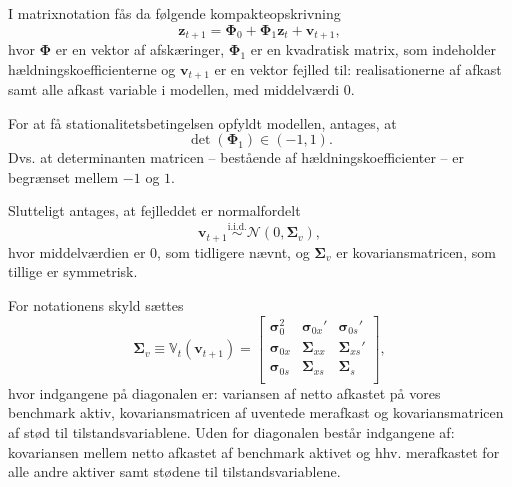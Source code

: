 \documentclass[
  a4paper,
  oneside]{memoir}
\begin{document}
\vspace{5mm}

I matrixnotation fås da følgende kompakteopskrivning
\begin{equation}\label{eq:1}
        \bm{z}_{t+1}=\bm{\Phi}_0+\bm{\Phi}_1\bm{z}_t+\bm{v}_{t+1},
    \end{equation}
hvor \(\bm{\Phi}\) er en vektor af afskæringer, \(\bm{\Phi}_1\) er en kvadratisk matrix, som indeholder hældningskoefficienterne og \(\bm{v}_{t+1}\) er en vektor fejlled til: realisationerne af afkast samt alle afkast variable i modellen, med middelværdi \(0\).

\vspace{5mm}

For at få stationalitetsbetingelsen opfyldt modellen, antages, at
\begin{equation*}
        \det(\bm{\Phi}_1)\in(-1,1).
    \end{equation*}
Dvs. at determinanten matricen -- bestående af hældningskoefficienter -- er begrænset mellem \(-1\) og \(1\).

\vspace{5mm}

Slutteligt antages, at fejlleddet er normalfordelt
\begin{equation}\label{eq:2}
        \bm{v}_{t+1}\overset{\text{i.i.d.}}{\sim}\mathcal{N}(0,\bm{\Sigma}_v),
    \end{equation}
hvor middelværdien er \(0\), som tidligere nævnt, og \(\bm{\Sigma}_v\) er kovariansmatricen, som tillige er symmetrisk.

For notationens skyld sættes
\begin{equation*}
        \bm{\Sigma}_v\equiv \mathbb{V}_t(\bm{v}_{t+1})=
        \begin{bmatrix}
        \bm{\sigma}_0^2 & \bm{\sigma}_{0x}' & \bm{\sigma}_{0s}'\\
        \bm{\sigma}_{0x} & \bm{\Sigma}_{xx} & \bm{\Sigma}_{xs}'\\
        \bm{\sigma}_{0s} & \bm{\Sigma}_{xs} & \bm{\Sigma}_{s}\\
        \end{bmatrix},
    \end{equation*}
hvor indgangene på diagonalen er: variansen af netto afkastet på vores benchmark aktiv, kovariansmatricen af uventede merafkast og kovariansmatricen af stød til tilstandsvariablene. Uden for diagonalen består indgangene af: kovariansen mellem netto afkastet af benchmark aktivet og hhv. merafkastet for alle andre aktiver samt stødene til tilstandsvariablene.
\end{document}

